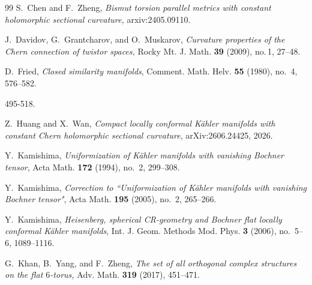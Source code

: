 \documentclass{amsart}
\numberwithin{equation}{section}
\begin{document}
\begin{thebibliography}{99}
 S.~Chen and F.~Zheng, \emph {Bismut torsion parallel metrics with constant holomorphic sectional curvature,} arxiv:2405.09110.



 J.~Davidov, G.~Grantcharov, and O.~Muskarov, \emph{Curvature properties of the Chern connection of twistor spaces,} Rocky Mt. J. Math. {\bf 39} (2009), no.\,1,  27--48.



 D.~Fried, \emph{Closed similarity manifolds},
Comment. Math. Helv. \textbf{55} (1980), no.~4, 576--582.



495-518.



 Z.~Huang and X.~Wan, \emph{Compact locally conformal K\"ahler manifolds with constant Chern holomorphic sectional curvature}, arXiv:2606.24425, 2026.

 Y.~Kamishima, \emph{Uniformization of K\"ahler manifolds with vanishing Bochner tensor}, Acta Math. \textbf{172} (1994), no.~2, 299--308.

Y.~Kamishima, \emph{Correction to ``Uniformization of K\"ahler manifolds with vanishing
Bochner tensor"}, Acta Math. \textbf{195} (2005), no.~2, 265--266.

 Y.~Kamishima, \emph{Heisenberg, spherical CR-geometry and Bochner flat locally conformal K\"ahler manifolds}, Int. J. Geom. Methods Mod. Phys. \textbf{3} (2006), no.~5--6, 1089--1116.

 G.~Khan, B.~Yang, and F.~Zheng, \emph{The set of all orthogonal complex structures on the flat $6$-torus,} Adv. Math. {\bf 319} (2017), 451--471.



\end{thebibliography}
\end{document}
